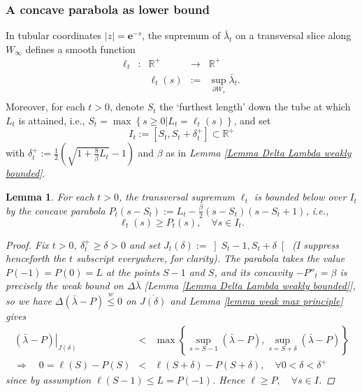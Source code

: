 \documentclass{article}
\newcommand{\R}{\mathbb{R}}
\newcommand{\wleq}{\overset{w}{\leq}}
\newcommand{\bl}{\bar\lambda}
\newcommand{\e}[1]{\mathbf{e}^{#1}}
\newtheorem{lemma}[theorem]{Lemma}
\begin{document}
\subsubsection{A concave parabola as lower bound}
In tubular coordinates $\left\vert z\right\vert=\e{-s}$, the supremum of $\bl_t$ on a transversal slice along $W_\infty$ defines a smooth function
\begin{displaymath}
\begin{array}{rcrcl}
        \ell_t&:&\R^+&\rightarrow&\R^+\\
        &&\ell_t(s)&:=& \sup\limits_{\partial W_s} \bl_t.\\
\end{array}
\end{displaymath}
Moreover, for each $t>0$, denote $S_t$ the `furthest length' down the tube at which $L_t$ is attained, i.e., $S_t=\max \left\{s\geq0\left\vert L_t=\ell_t\left( s \right)\right.\right\}$, and set
\begin{displaymath}
        I_t := \left[ S_t,S_t + \delta^{+}_t\right]\subset \R^+
\end{displaymath}
with $\delta^{+}_t:= \frac{1}{2}\left(\sqrt{1+\frac{8}{\beta}L_t}-1\right)$ and $\beta$ as in \emph{Lemma \ref{Lemma Delta Lambda weakly bounded}}.
\begin{lemma}           \label{lemma parabola} 
For each $t>0$, the transversal supremum $\ell_t$ is bounded below over $I_t$ by the concave parabola $P_t(s-S_t):= L_t -\frac{\beta}{2}(s-S_t)(s-S_t+1)$, i.e.,
\begin{displaymath}
        \ell_t(s)\geq P_t(s), \quad \forall s\in I_t.
\end{displaymath}
\begin{proof}
Fix $t>0$, $\delta^+_t\geq\delta>0$ and set $J_t\left( \delta \right):= \left]S_{t}-1,S_{t}+\delta\right[ $ (I suppress henceforth the $t$ subscript everywhere, for clarity). The parabola takes the value $P(-1)=P(0)=L$ at the points $S-1$ and $S$, and its concavity $-P''_t=\beta$ is precisely the weak bound on $\Delta\bl$ [\emph{Lemma \ref{Lemma Delta Lambda weakly bounded}}], so we have $\Delta\left( \bl - P\right)\wleq0$ on $\overline{J(\delta)}$ and  \emph{Lemma \ref{lemma weak max principle}} gives
\begin{eqnarray*}
         \left.\left( \bl - P \right)\right\vert_{J(\delta)}
        &<& \max \left\{ 
        \sup\limits_{s=S-1} \left( \bl - P \right),  
        \sup\limits_{s=S+\delta}\left( \bl - P \right)\right\}\\
        \Rightarrow \quad0=\ell(S)-P(S) &<& \ell(S+\delta)-P(S+\delta),
        \quad \forall 0<\delta<\delta^+ 
\end{eqnarray*}
since by assumption $\ell(S-1)\leq L=P(-1)$. Hence $\ell\geq P,\quad \forall s\in I$.
\end{proof}
\end{lemma}
\end{document}
